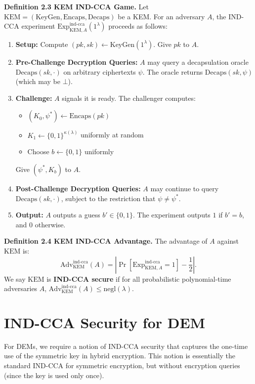 \noindent\textbf{Definition 2.3 KEM IND-CCA Game.} Let $\text{KEM} = (\text{KeyGen}, \text{Encaps}, \text{Decaps})$ be a KEM. For an adversary $A$, the IND-CCA experiment $\text{Exp}_{\text{KEM},A}^{\text{ind-cca}}(1^\lambda)$ proceeds as follows:
\begin{enumerate}
    \item \textbf{Setup:} Compute $(pk, sk) \gets \text{KeyGen}(1^\lambda)$. Give $pk$ to $A$.
    \item \textbf{Pre-Challenge Decryption Queries:} $A$ may query a decapsulation oracle $\text{Decaps}(sk, \cdot)$ on arbitrary ciphertexts $\psi$. The oracle returns $\text{Decaps}(sk, \psi)$ (which may be $\bot$).
    \item \textbf{Challenge:} $A$ signals it is ready. The challenger computes:
    \begin{itemize}
        \item $(K_0, \psi^*) \gets \text{Encaps}(pk)$
        \item $K_1 \gets \{0,1\}^{\kappa(\lambda)}$ uniformly at random
        \item Choose $b \gets \{0,1\}$ uniformly
    \end{itemize}
    Give $(\psi^*, K_b)$ to $A$.
    \item \textbf{Post-Challenge Decryption Queries:} $A$ may continue to query $\text{Decaps}(sk, \cdot)$, subject to the restriction that $\psi \neq \psi^*$.
    \item \textbf{Output:} $A$ outputs a guess $b' \in \{0,1\}$. The experiment outputs $1$ if $b' = b$, and $0$ otherwise.
\end{enumerate}

\noindent\textbf{Definition 2.4 KEM IND-CCA Advantage.} The advantage of $A$ against $\text{KEM}$ is:
$$
\text{Adv}_{\text{KEM}}^{\text{ind-cca}}(A) = \left|\Pr[\text{Exp}_{\text{KEM},A}^{\text{ind-cca}} = 1] - \frac{1}{2}\right|.
$$
We say $\text{KEM}$ is \textbf{IND-CCA secure} if for all probabilistic polynomial-time adversaries $A$, $\text{Adv}_{\text{KEM}}^{\text{ind-cca}}(A) \le \text{negl}(\lambda)$.

\section{IND-CCA Security for DEM}

For DEMs, we require a notion of IND-CCA security that captures the one-time use of the symmetric key in hybrid encryption. This notion is essentially the standard IND-CCA for symmetric encryption, but without encryption queries (since the key is used only once).

